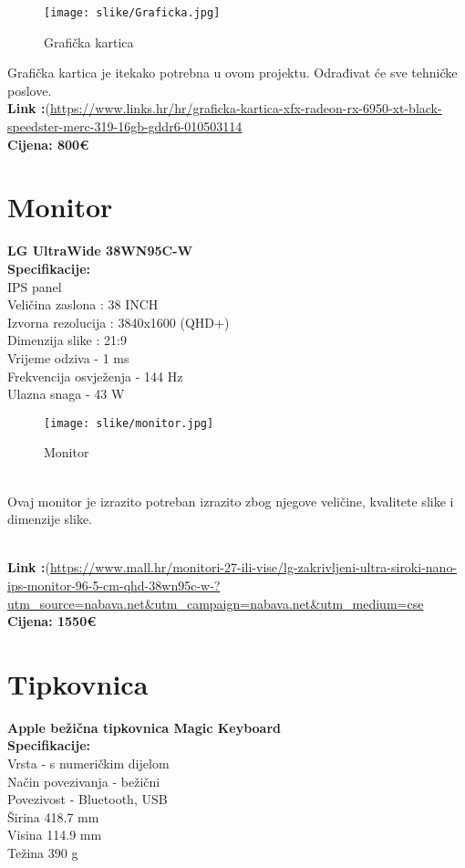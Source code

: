 \documentclass{article}
\begin{document}
\begin{figure}[h!]
    \centering
    \texttt{[image: slike/Graficka.jpg]}
    \caption{Grafička kartica}
    \label{fig:method}
\end{figure}

Grafička kartica je itekako potrebna u ovom projektu. Odrađivat će sve tehničke poslove.
\\ \textbf{Link :}(\url{https://www.links.hr/hr/graficka-kartica-xfx-radeon-rx-6950-xt-black-speedster-merc-319-16gb-gddr6-010503114}
\\ \textbf{Cijena: 800€}

\newpage
\section{Monitor}
\textbf{LG UltraWide 38WN95C-W}
\\ \textbf{Specifikacije:}
\\ IPS panel
\\ Veličina zaslona : 38 INCH
\\ Izvorna rezolucija : 3840x1600 (QHD+)
\\ Dimenzija slike : 21:9
\\Vrijeme odziva - 1 ms
\\Frekvencija osvježenja - 144 Hz
\\Ulazna snaga - 43 W

\begin{figure}[h!]
    \centering
    \texttt{[image: slike/monitor.jpg]}
    \caption{Monitor}
    \label{fig:method}
\end{figure}
\\ Ovaj monitor je izrazito potreban izrazito zbog njegove veličine, kvalitete slike i dimenzije slike. 

\\ \textbf{Link :}(\url{https://www.mall.hr/monitori-27-ili-vise/lg-zakrivljeni-ultra-siroki-nano-ips-monitor-96-5-cm-qhd-38wn95c-w-?utm_source=nabava.net&utm_campaign=nabava.net&utm_medium=cse}
\\ \textbf{Cijena: 1550€}

\newpage
\section{Tipkovnica}
\textbf{Apple bežična tipkovnica Magic Keyboard}
\\ \textbf{Specifikacije:}
\\ Vrsta - s numeričkim dijelom
\\ Način povezivanja - bežični
\\Povezivost - Bluetooth, USB
\\Širina	418.7 mm
\\Visina	114.9 mm
\\Težina	390 g
\end{document}
